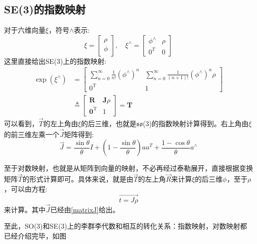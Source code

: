 \subsection{SE(3)的指数映射}
对于六维向量$\xi$，符号$\wedge$表示:
\begin{equation}
\xi=\left[ \begin{array}{l}{\rho} \\ {\phi}\end{array}\right], \quad \xi^{\wedge}=\left[ \begin{array}{cc}{\phi^{\wedge}} & {\rho} \\ {0^{T}} & {0}\end{array}\right]
\end{equation}
这里直接给出SE(3)上的指数映射:
\begin{equation}
\begin{aligned}
\exp \left(\xi^{\wedge}\right)&=\left[ \begin{array}{cc}{\sum_{n=0}^{\infty} \frac{1}{n !}\left(\phi^{\wedge}\right)^{n}} & {\sum_{n=0}^{\infty} \frac{1}{(n+1) !}\left(\phi^{\wedge}\right)^{n} \rho} \\ {0^{\mathrm{T}}} & {1}\end{array}\right]\\
&\triangleq \left[ \begin{array}{cc}{\boldsymbol{R}} & {\boldsymbol{J} \rho} \\ {\mathbf{0}^{\mathrm{T}}} & {1}\end{array}\right]=\boldsymbol{T}
\end{aligned}
\end{equation}
可以看到，$\vec{T}$的左上角由$\xi$的后三维，也就是$\mathfrak{so}$(3)的指数映射计算得到。右上角由$\xi$的前三维左乘一个$\vec J$矩阵得到:
\begin{equation}
\vec J=\frac{\sin \theta}{\theta} I+\left(1-\frac{\sin \theta}{\theta}\right) a a^{T}+\frac{1-\cos \theta}{\theta} a^{\wedge}
\label{matrixJ}
\end{equation}\par
至于对数映射，也就是从矩阵到向量的映射，不必再经过泰勒展开，直接根据变换矩阵$\vec T$的形式计算即可。具体来说，就是由$\vec T$的左上角$\vec R$来计算$\xi$的后三维$\phi$，至于$\rho$，可以由方程:
\begin{equation}
	\vec{t=J\rho}
\end{equation}
来计算。其中$\vec J$已经由\ref{matrixJ}给出。\par
至此，SO(3)和SE(3)上的李群李代数和相互的转化关系：指数映射，对数映射都已经介绍完毕，如图
